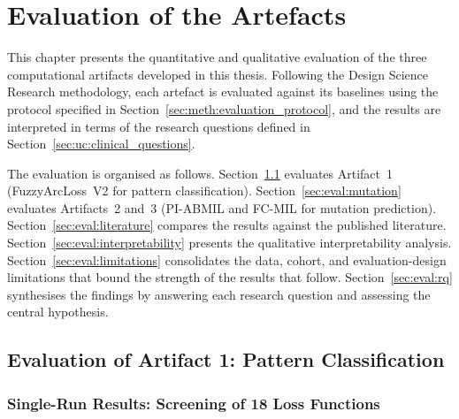 
\chapter{Evaluation of the Artefacts}
\label{ch:evaluation}

This chapter presents the quantitative and qualitative evaluation of the three computational artifacts developed in this thesis.
Following the Design Science Research methodology, each artefact is evaluated against its baselines using the protocol specified in Section~\ref{sec:meth:evaluation_protocol}, and the results are interpreted in terms of the research questions defined in Section~\ref{sec:uc:clinical_questions}.

The evaluation is organised as follows.
Section~\ref{sec:eval:pattern} evaluates Artifact~1
(FuzzyArcLoss~V2 for pattern classification).
Section~\ref{sec:eval:mutation} evaluates Artifacts~2 and~3
(PI-ABMIL and FC-MIL for mutation prediction).
Section~\ref{sec:eval:literature} compares the results against the
published literature.
Section~\ref{sec:eval:interpretability} presents the qualitative
interpretability analysis.
Section~\ref{sec:eval:limitations} consolidates the data, cohort,
and evaluation-design limitations that bound the strength of the
results that follow.
Section~\ref{sec:eval:rq} synthesises the findings by answering each
research question and assessing the central hypothesis.


\section{Evaluation of Artifact 1: Pattern Classification}
\label{sec:eval:pattern}

\subsection{Single-Run Results: Screening of 18 Loss Functions}
\label{sec:eval:pattern:singlerun}

